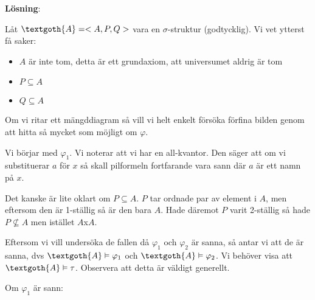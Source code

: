 \par\bigskip
\noindent\textbf{Lösning}:\par
\noindent Låt $\textgoth{A} = <A,P,Q>$ vara en $\sigma$-struktur (godtycklig). Vi vet ytterst få saker:
\begin{itemize}
  \item $A$ är inte tom, detta är ett grundaxiom, att universumet aldrig är tom
  \item $P\subseteq A$
  \item $Q\subseteq A$
\end{itemize}
\par\bigskip
\noindent Om vi ritar ett mängddiagram så vill vi helt enkelt försöka förfina bilden genom att hitta så mycket som möjligt om $\varphi$.\par
\noindent Vi börjar med $\varphi_1$. Vi noterar att vi har en all-kvantor. Den säger att om vi substituerar $a$ för $x$ så skall pilformeln fortfarande vara sann där $a$ är ett namn på $x$.
\par\bigskip
\noindent Det kanske är lite oklart om $P\subseteq A$. $P$ tar ordnade par av element i $A$, men eftersom den är 1-ställig så är den bara $A$. Hade däremot $P$ varit 2-ställig så hade $P\nsubseteq A$ men istället $A$x$A$.
\par\bigskip
\noindent Eftersom vi vill undersöka de fallen då $\varphi_1$ och $\varphi_2$ är sanna, så antar vi att de är sanna, dvs $\textgoth{A}\vDash\varphi_1$ och $\textgoth{A}\vDash\varphi_2$. Vi behöver visa att $\textgoth{A}\vDash\tau$. Observera att detta är väldigt generellt.\par
\noindent Om $\varphi_1$ är sann:


